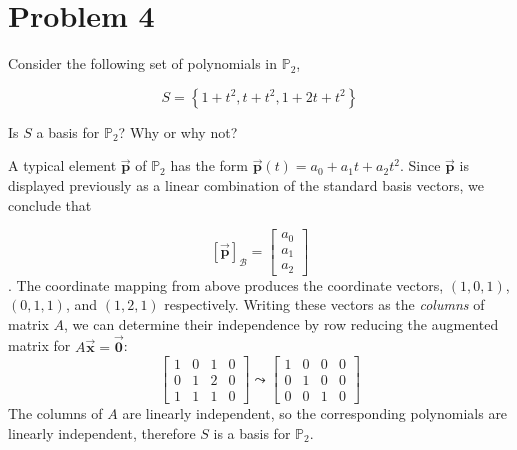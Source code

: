 \documentclass[letter,11pt]{article}
\theoremstyle{definition}
\begin{document}
\section{Problem 4}
Consider the following set of polynomials in $\mathbb{P}_{2}$,

$$S=\left\{1+t^{2}, t+t^{2}, 1+2 t+t^{2}\right\}$$

Is $S$ a basis for $\mathbb{P}_{2}$? Why or why not?

\begin{tcolorbox}[boxrule=1mm,enhanced jigsaw, breakable,before=\hfill,after=\hfill,adjusted title={Problem 4 solutions}]
A typical element $\vec{\boldsymbol{p}}$ of $\mathbb{P}_2$ has the form $\vec{\boldsymbol{p}}(t) = a_{0}+a_{1}t+a_{2}t^2$. Since $\vec{\boldsymbol{p}}$ is displayed previously as a linear combination of the standard basis vectors, we conclude that

$$\left[\vec{\boldsymbol{p}}\right]_{\mathcal{B}} = \begin{bmatrix} a_0 \\ a_{1} \\ a_{2}\end{bmatrix}$$.
\tcblower
The coordinate mapping from above produces the coordinate vectors, $(1,0,1)$, $(0,1,1)$, and $(1,2,1)$ respectively. Writing these vectors as the \textit{columns} of matrix $A$, we can determine their independence by row reducing the augmented matrix for $A\vec{\boldsymbol{x}} = \vec{\boldsymbol{0}}$:
$$\begin{bmatrix}
    1 & 0 & 1 & 0\\
    0 & 1 & 2 & 0\\
    1 & 1 & 1 & 0
\end{bmatrix} \leadsto
\begin{bmatrix}
    1 & 0 & 0 & 0\\
    0 & 1 & 0 & 0\\
    0 & 0 & 1 & 0
\end{bmatrix}
$$
The columns of $A$ are linearly independent, so the corresponding polynomials are linearly independent, therefore $S$ is a basis for $\mathbb{P}_{2}$.
\end{tcolorbox}
\newpage
\end{document}
